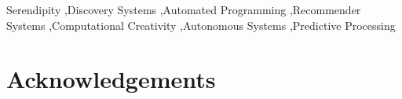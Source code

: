 \documentclass[natbib,a4paper,preprint,number,sort&compress,times]{elsarticle}
\begin{document}
\begin{frontmatter}
\begin{abstract}
\end{abstract}

\begin{keyword}
Serendipity \sep Discovery Systems \sep Automated Programming \sep Recommender Systems \sep Computational Creativity \sep Autonomous Systems \sep Predictive Processing
\end{keyword}

\end{frontmatter}



\thispagestyle{plain}
\pagestyle{plain}

\clearpage


%


%

%
%
\setcounter{footnote}{0}





% 

%



\section*{Acknowledgements}
\end{document}
